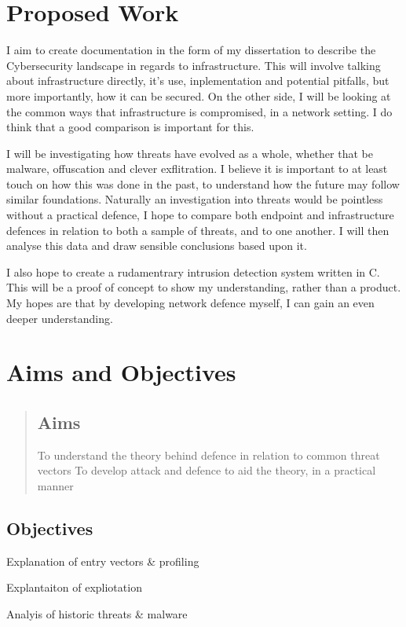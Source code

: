 \section{Proposed Work}
\label{proposed}
I aim to create documentation in the form of my dissertation to describe the Cybersecurity landscape in regards to infrastructure. 
This will involve talking about infrastructure directly, it's use, inplementation and potential pitfalls, but more importantly, how it can be secured.
On the other side, I will be looking at the common ways that infrastructure is compromised, in a network setting. 
I do think that a good comparison is important for this. 

I will be investigating how threats have evolved as a whole,
whether that be malware, offuscation and clever exflitration. I believe it is important to at least touch on how this was done in the past, 
to understand how the future may follow similar foundations. Naturally an investigation into threats would be pointless without a practical defence, 
I hope to compare both endpoint and infrastructure defences in relation to both a sample of threats, and to one another. I will then analyse this data and draw sensible conclusions based upon it.

I also hope to create a rudamentrary intrusion detection system written in C. This will be a proof of concept to show my understanding, rather than a product. My hopes are that by developing network defence myself, 
I can gain an even deeper understanding.

\section{Aims and Objectives}
\begin{quote}
\subsection{Aims}
	To understand the theory behind defence in relation to common threat vectors
	To develop attack and defence to aid the theory, in a practical manner
\end{quote}

\subsection{Objectives}
Explanation of entry vectors & profiling

Explantaiton of expliotation

Analyis of historic threats & malware

